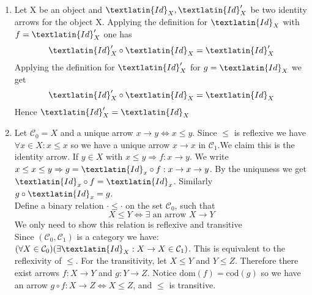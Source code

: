 \documentclass[11pt]{article}
\theoremstyle{plain}
\theoremstyle{definition}
\theoremstyle{remark}
\newcommand{\cC}{\mathcal{C}}
\newcommand{\dom}{\mathrm{dom}}
\newcommand{\cod}{\mathrm{cod}}
\begin{document}
\begin{exercises}
\begin{enumerate}
\item Let X be an object and $\textlatin{Id}_X,\textlatin{Id}'_X$ be two identity arrows for the object X. Applying the definition for $\textlatin{Id}_X$ with $f=\textlatin{Id}'_X$ one has \[\textlatin{Id}'_X \circ \textlatin{Id}_X=\textlatin{Id}'_X\]
Applying the definition for $\textlatin{Id}'_X$ for $g=\textlatin{Id}_X$ we get \[\textlatin{Id}'_X \circ \textlatin{Id}_X=\textlatin{Id}_X\]
Hence $\textlatin{Id}'_X =\textlatin{Id}_X$

\item Let $\cC_0=X$ and a unique arrow $x \to y\iff x \leq y$. Since $ \leq$ is reflexive we have $\forall x \in X: x \leq x$ so we have a unique arrow $x \to x$ in $\cC_1$.We claim this is the identity arrow. If $y \in X$ with $x \leq y \Rightarrow f: x \to y$. We write $x \leq x \leq y \Rightarrow g=\textlatin{Id}_x \circ f :x \to x \to y$. By the uniquness we get $\textlatin{Id}_x \circ f=\textlatin{Id}_x$. Similarly $g \circ \textlatin{Id}_x=g$.\\

Define a binary relation $\cdot \leq \cdot$ on the set $\mathcal{C}_0$, such that \[X  \leq Y \iff \exists \text{  an arrow  } X \to Y \]
We only need to show this relation is reflexive and transitive\\
Since $( \mathcal{C}_0,\mathcal{C}_1)$ is a category we have:\\
$(\forall X \in \mathcal{C}_0) (\exists \textlatin{Id}_X:X \to X \in \mathcal{C}_1)$. This is equivalent to the reflexivity of $ \leq$.
For the transitivity, let $X \leq Y$ and $Y \leq Z$. Therefore there exist arrows $f:X \to Y$ and $g:Y \to Z$. Notice $\dom(f)=\cod(g)$ so we have an arrow $g \circ f:X \to Z \iff X \leq Z$, and $\leq$ is transitive.


\end{enumerate}
\end{exercises}
\end{document}
